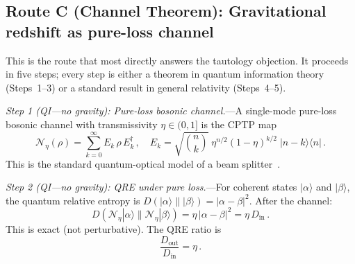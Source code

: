 \documentclass[aps,prd,preprint,superscriptaddress,longbibliography]{revtex4-2}
\newcommand{\chan}{\mathcal{N}}
\newcommand{\ket}[1]{|#1\rangle}
\newcommand{\bra}[1]{\langle#1|}
\begin{document}
\subsection{Route C (Channel Theorem): Gravitational redshift as
pure-loss channel}
\label{sec:routeC}

This is the route that most directly answers the tautology
objection.  It proceeds in five steps; every step is either a
theorem in quantum information theory (Steps~1--3) or a standard
result in general relativity (Steps~4--5).

\emph{Step 1 (QI---no gravity): Pure-loss bosonic channel.}---A
single-mode pure-loss bosonic channel with transmissivity
$\eta \in (0,1]$ is the CPTP map~\cite{Weedbrook2012}
\begin{equation}
  \chan_\eta(\rho) = \sum_{k=0}^{\infty} E_k\,\rho\,E_k^\dagger\,,
  \quad
  E_k = \sqrt{\binom{n}{k}}\;\eta^{n/2}(1-\eta)^{k/2}\;\ket{n-k}\bra{n}\,.
  \label{eq:Kraus_loss}
\end{equation}
This is the standard quantum-optical model of a beam
splitter~\cite{Weedbrook2012}.

\emph{Step 2 (QI---no gravity): QRE under pure loss.}---For coherent
states $\ket{\alpha}$ and $\ket{\beta}$, the quantum relative entropy
is $D(\ket{\alpha}\|\ket{\beta}) = |\alpha - \beta|^2$.
After the channel:
\begin{equation}
  D(\chan_\eta\ket{\alpha}\|\chan_\eta\ket{\beta})
  = \eta\,|\alpha - \beta|^2
  = \eta\,D_{\mathrm{in}}\,.
  \label{eq:DeltaD_loss}
\end{equation}
This is exact (not perturbative).  The QRE ratio is
\begin{equation}
  \frac{D_{\mathrm{out}}}{D_{\mathrm{in}}} = \eta\,.
  \label{eq:QRE_ratio}
\end{equation}
\end{document}
